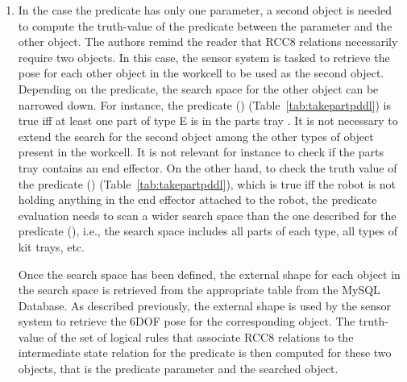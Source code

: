 \begin{enumerate}
\item In the case the predicate has only one parameter, a second object is needed to compute the truth-value of the predicate between the parameter and the other object. The authors remind the reader that RCC8 relations necessarily require two objects. In this case, the sensor system is tasked to retrieve the pose for each other object in the workcell to be used as the second object. Depending on the predicate, the search space for the other object can be narrowed down. For instance, the predicate () (Table~\ref{tab:takepartpddl}) is true iff at least one part of type E is in the parts tray . It is not necessary to extend the search for the second object among the other types of object present in the workcell. It is not relevant for instance to check if the parts tray contains an end effector. On the other hand, to check the truth value of the predicate () (Table~\ref{tab:takepartpddl}), which is true iff the robot  is not holding anything in the end effector attached to the robot, the predicate evaluation needs to scan a wider search space than the one described for the predicate (), i.e., the search space includes all parts of each type, all types of kit trays, etc. 

Once the search space has been defined, the external shape for each object in the search space is retrieved from the appropriate table from the \textsf{MySQL Database}. As described previously, the external shape is used by the sensor system to retrieve the 6DOF pose for the corresponding object. The truth-value of the set of logical rules that associate RCC8 relations to the intermediate state relation for the predicate is then computed for these two objects, that is the predicate parameter and the searched object. 
%


\end{enumerate}
